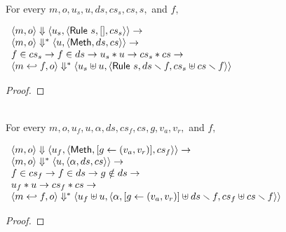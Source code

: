\begin{lemma}
  \label{lem-inlinedmm-rule}
  \mbox{}\\
  For every $m, o, u_s, u, ds, cs_s, cs, s,$ and $f,$
  \begin{center}
    \begin{math}
      \begin{array}{l}
        \langle m, o \rangle \Downarrow \langle u_s, \langle \textsf{Rule}\ s, [], cs_s \rangle \rangle \to \\
        \langle m, o \rangle \Downarrow^{\ast} \langle u, \langle \textsf{Meth}, ds, cs \rangle \rangle \to \\
        f \in cs_s \to f \in ds \to u_s \ast u \to cs_s \ast cs \to \\
        \langle m \hookleftarrow{} f, o \rangle \Downarrow^{\ast} \langle u_s \uplus u, \langle \textsf{Rule}\ s, ds \smallsetminus{} f, cs_s \uplus cs \smallsetminus{} f \rangle \rangle
      \end{array}
    \end{math}
  \end{center}
\end{lemma}
\begin{proof}
\end{proof}

\begin{lemma}
  \label{lem-inlinedmm-meth1}
  \mbox{}\\
  For every $m, o, u_f, u, \alpha, ds, cs_f, cs, g, v_a, v_r,$ and $f,$
  \begin{center}
    \begin{math}
      \begin{array}{l}
        \langle m, o \rangle \Downarrow \langle u_f, \langle \textsf{Meth},  [ g \leftarrow (v_a, v_r) ], cs_f \rangle \rangle \to \\
        \langle m, o \rangle \Downarrow^{\ast} \langle u, \langle \alpha, ds, cs \rangle \rangle \to \\
        f \in cs_f \to f \in ds \to g \notin ds \to \\
        u_f \ast u \to cs_f \ast cs \to \\
        \langle m \hookleftarrow{} f, o \rangle \Downarrow^{\ast} \langle u_f \uplus u, \langle \alpha,  [ g \leftarrow (v_a, v_r) ] \uplus ds \smallsetminus{} f, cs_f \uplus cs \smallsetminus{} f \rangle \rangle
      \end{array}
    \end{math}
  \end{center}
\end{lemma}
\begin{proof}
\end{proof}

